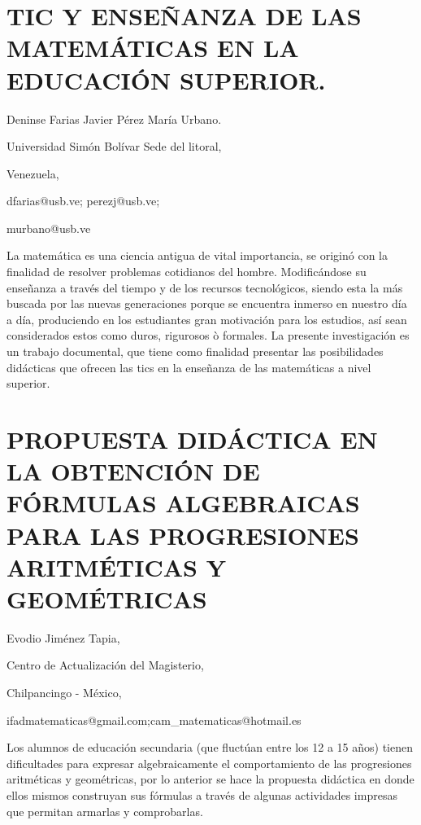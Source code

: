 \section{TIC Y ENSEÑANZA DE LAS MATEMÁTICAS EN LA EDUCACIÓN SUPERIOR.}

\begin{datos}

Deninse Farias Javier Pérez María Urbano.

Universidad Simón Bolívar Sede del litoral,

Venezuela,

dfarias@usb.ve; perezj@usb.ve;

murbano@usb.ve 

\end{datos}

La matemática es una ciencia antigua de vital importancia, se originó
con la finalidad de resolver problemas cotidianos del hombre. Modificándose
su enseñanza a través del tiempo y de los recursos tecnológicos, siendo
esta la más buscada por las nuevas generaciones porque se encuentra
inmerso en nuestro día a día, produciendo en los estudiantes gran
motivación para los estudios, así sean considerados estos como duros,
rigurosos ò formales. La presente investigación es un trabajo documental,
que tiene como finalidad presentar las posibilidades didácticas que
ofrecen las tics en la enseñanza de las matemáticas a nivel superior. 


\section{PROPUESTA DIDÁCTICA EN LA OBTENCIÓN DE FÓRMULAS ALGEBRAICAS PARA
LAS PROGRESIONES ARITMÉTICAS Y GEOMÉTRICAS}

\begin{datos}

Evodio Jiménez Tapia,

Centro de Actualización del Magisterio,

Chilpancingo - México,

ifadmatematicas@gmail.com;cam\_matematicas@hotmail.es 

\end{datos}

Los alumnos de educación secundaria (que fluctúan entre los 12 a 15
años) tienen dificultades para expresar algebraicamente el comportamiento
de las progresiones aritméticas y geométricas, por lo anterior se
hace la propuesta didáctica en donde ellos mismos construyan sus fórmulas
a través de algunas actividades impresas que permitan armarlas y comprobarlas.


